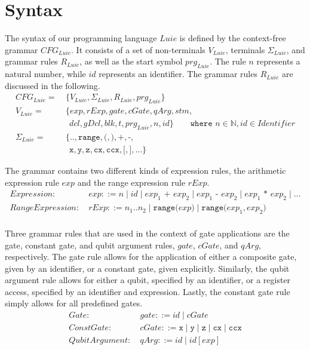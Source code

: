\section{Syntax}
\label{sec:concept_abstractGrammar}
The syntax of our programming language $Luie$ is defined by the context-free grammar $CFG_{Luie}$. It consists of a set of non-terminals $V_{Luie}$, terminals $\Sigma_{Luie}$, and grammar rules $R_{Luie}$, as well as the start symbol $prg_{Luie}$. The rule $n$ represents a natural number, while $id$ represents an identifier. The grammar rules $R_{Luie}$ are discussed in the following.
\begin{align*}
    CFG_{Luie} = \ & \{V_{Luie}, \Sigma_{Luie}, R_{Luie}, prg_{Luie} \}\\ 
    V_{Luie} = \ & \{ exp, rExp, gate, cGate, qArg, stm,\\ 
            & \ \  dcl, gDcl, blk, t, prg_{Luie}, n, id \} \quad \quad \texttt{where } n \in \mathbb{N}, id \in Identifier\\ 
    \Sigma_{Luie} = \ & \{\texttt{..}, \texttt{range}, \texttt{(}, \texttt{)}, \texttt{+}, \texttt{-}, \\
               & \ \ \texttt{x}, \texttt{y}, \texttt{z}, \texttt{cx}, \texttt{ccx}, \texttt{[}, \texttt{]}, \dots \} 
\end{align*}

The grammar contains two different kinds of expression rules, the arithmetic expression rule $exp$ and the range expression rule $rExp$.
\begin{align*}
    Expression: \ & exp ::= n \mid id \mid exp_1 \texttt{ + } exp_2 \mid exp_1 \texttt{ - } exp_2 \mid exp_1 \texttt{ * } exp_2 \mid \dots\\
    RangeExpression: \ & rExp ::= n_1 .. n_2 \mid \texttt{range(} exp \texttt{)} \mid \texttt{range(} exp_1, exp_2 \texttt{)}\\
\end{align*}

Three grammar rules that are used in the context of gate applications are the gate, constant gate, and qubit argument rules, $gate$, $cGate$, and $qArg$, respectively. The gate rule allows for the application of either a composite gate, given by an identifier, or a constant gate, given explicitly. Similarly, the qubit argument rule allows for either a qubit, specified by an identifier, or a register access, specified by an identifier and expression. Lastly, the constant gate rule simply allows for all predefined gates. 
\begin{align*}
    Gate: \ & gate ::= id \mid cGate\\
    ConstGate: \ & cGate ::= \texttt{x} \mid \texttt{y} \mid \texttt{z} \mid \texttt{cx} \mid \texttt{ccx}\\
    QubitArgument: \ & qArg ::= id \mid id[exp]
\end{align*}


